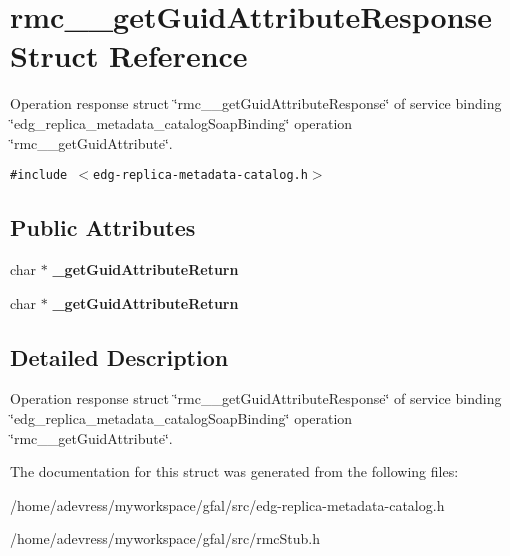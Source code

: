 \section{rmc\_\-\_\-get\-Guid\-Attribute\-Response Struct Reference}
\label{structrmc____getGuidAttributeResponse}
Operation response struct \char`\"{}rmc\_\-\_\-get\-Guid\-Attribute\-Response\char`\"{} of service binding \char`\"{}edg\_\-replica\_\-metadata\_\-catalog\-Soap\-Binding\char`\"{} operation \char`\"{}rmc\_\-\_\-get\-Guid\-Attribute\char`\"{}.  


{\tt \#include $<$edg-replica-metadata-catalog.h$>$}

\subsection*{Public Attributes}
\begin{CompactItemize}
\item 
char $\ast$ \textbf{\_\-get\-Guid\-Attribute\-Return}\label{structrmc____getGuidAttributeResponse_f40d690f5c6f2665e4999ca8f11f9ab5}

\item 
char $\ast$ \textbf{\_\-get\-Guid\-Attribute\-Return}\label{structrmc____getGuidAttributeResponse_f40d690f5c6f2665e4999ca8f11f9ab5}

\end{CompactItemize}


\subsection{Detailed Description}
Operation response struct \char`\"{}rmc\_\-\_\-get\-Guid\-Attribute\-Response\char`\"{} of service binding \char`\"{}edg\_\-replica\_\-metadata\_\-catalog\-Soap\-Binding\char`\"{} operation \char`\"{}rmc\_\-\_\-get\-Guid\-Attribute\char`\"{}. 



The documentation for this struct was generated from the following files:\begin{CompactItemize}
\item 
/home/adevress/myworkspace/gfal/src/edg-replica-metadata-catalog.h\item 
/home/adevress/myworkspace/gfal/src/rmc\-Stub.h\end{CompactItemize}

